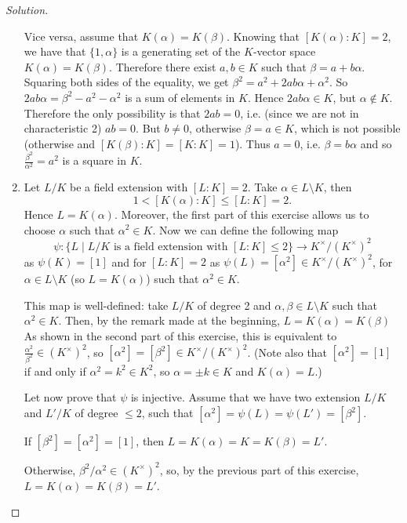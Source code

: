 \documentclass[a4paper,10pt,reqno]{amsart}
\theoremstyle{definition} %
\newenvironment{sol}
  {\renewcommand\qedsymbol{$\blacksquare$}\begin{proof}[Solution]}
  {\end{proof}}
\begin{document}
\begin{sol}
\begin{enumerate}[label=(\roman*)]
        Vice versa, assume that 
        $K(\alpha)=K(\beta)$.
        Knowing that $[K(\alpha):K]=2$, 
        we have that $\{1,\alpha\}$ 
        is a generating set of the $K$-vector space $K(\alpha)=K(\beta)$.
        Therefore there exist $a,b\in K$ such that
        $\beta=a+b\alpha$.
        Squaring both sides of the equality, we get
        $\beta^2=a^2+2ab\alpha+\alpha^2$.
        So
        $2ab\alpha=\beta^2-a^2-\alpha^2$ is a sum of elements in $K$.
        Hence $2ab\alpha\in K$, but $\alpha\not\in K$.
        Therefore the only possibility is that $2ab=0$, i.e. (since we are not in characteristic 2)
        $ab=0$. But $b\neq 0$, otherwise $\beta=a\in K$, which is not possible (otherwise
        and $[K(\beta):K]=[K:K]=1$).
        Thus $a=0$, i.e. $\beta=b\alpha$ and so $\frac{\beta^2}{\alpha^2}=a^2$ is a square in $K$.
        \item Let $L/K$ be a field extension with $[L:K]=2$. 
        Take $\alpha\in L\setminus K$, then
        \[
        1<[K(\alpha):K]\leq [L:K]=2.
        \]
        Hence $L=K(\alpha)$.
        Moreover, the first part of this exercise allows us to choose $\alpha$ such that $\alpha^2\in K$.
        Now we can define the following map
        \[\psi:\{L\mid L/K \text{ is a field extension with } [L:K] \leq 2\}\to K^\times/(K^\times)^2\]
        as $\psi(K)=[1]$ and for
        $[L:K]=2$ as $\psi(L)=[\alpha^2]\in K^\times/(K^\times)^2$, for $\alpha\in L\setminus K$ (so $L=K(\alpha)$) such that $\alpha^2\in K$.     
        
        This map is well-defined:
        take $L/K$ of degree 2 and
        $\alpha,\beta\in L\setminus K$ such that $\alpha^2\in K$.
        Then, by the remark made at the beginning, $L=K(\alpha)=K(\beta)$ 
        As shown in the second part of this exercise, this is equivalent to $\frac{\alpha^2}{\beta^2}\in (K^\times)^2$, so $[\alpha^2]=[\beta^2]\in K^\times/(K^\times)^2$.
        (Note also that $[\alpha^2]=[1]$  if and only if $\alpha^2 =k^2\in K^2$,
        so $\alpha=\pm k\in K$ and $K(\alpha)=L$.)

        Let now prove that $\psi$ is injective.
        Assume that we have 
        two extension $L/K$ and 
        $L'/K$ of degree $\leq 2$, such that
        $[\alpha^2]=\psi(L)=\psi(L')=[\beta^2]$.
        
        If $[\beta^2]=[\alpha^2]=[1]$,
        then $L=K(\alpha)=K=K(\beta)=L'$.
        
        Otherwise, $\beta^2/\alpha^2\in (K^\times)^2$,
        so, by the previous part of this exercise,
        $L=K(\alpha)=K(\beta)=L'$.     


\end{enumerate}
\end{sol}
\end{document}
